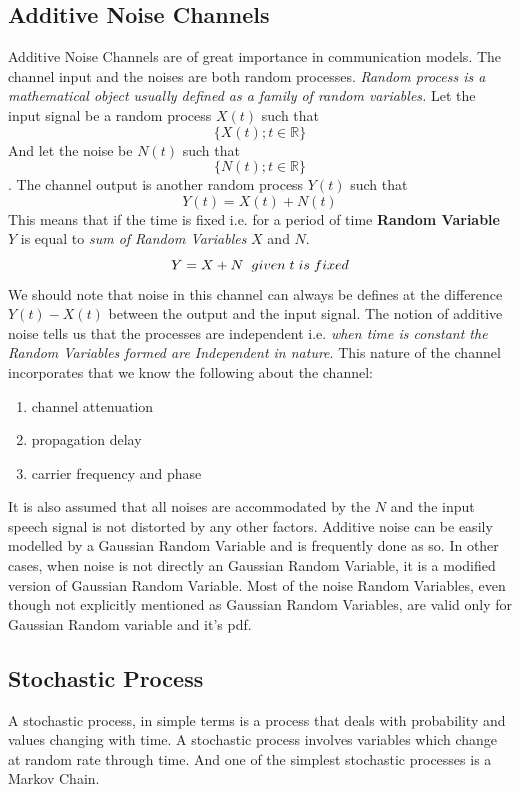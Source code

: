 \documentclass[10pt,twocolumn,letterpaper]{article}
\begin{document}

\subsection{Additive Noise Channels}
Additive Noise Channels are of great importance in communication models. The channel input and the noises are both random processes. \textit{Random process is a mathematical object usually defined as a family of random variables.} Let the input signal be a random process $X(t)$ such that   
$$ \{X(t); t \in \mathbb{R}\}$$
And let the noise be $N(t)$ such that 
$$ \{N(t); t \in \mathbb{R}\}$$.
The channel output is another random process $Y(t)$ such that
$$ Y(t) = X(t) + N(t)$$
This means that if the time is fixed i.e. for a period of time \textbf{Random Variable} $Y$ is equal to \textit{sum of Random Variables} $X$ and $N$.
$$Y = X + N \hspace{0.2cm} given \hspace{0.1cm} t \hspace{0.1cm} is \hspace{0.1cm} fixed$$
We should note that noise in this channel can always be defines at the difference $Y(t) - X(t)$ between the output and the input signal. The notion of additive noise tells us that the processes are independent i.e. \textit{when time is constant the Random Variables formed are Independent in nature}. This nature of the channel incorporates that we know the following about the channel:
\begin{enumerate}
    \item channel attenuation
    \item propagation delay
    \item carrier frequency and phase
\end{enumerate}
It is also assumed that all noises are accommodated by the $N$ and the input speech signal is not distorted by any other factors.
Additive noise can be easily modelled by a Gaussian Random Variable and is frequently done as so. In other cases, when noise is not directly an Gaussian Random Variable, it is a modified version of Gaussian Random Variable. Most of the noise Random Variables, even though not explicitly mentioned as Gaussian Random Variables, are valid only for Gaussian Random variable and it's pdf.


\subsection{Stochastic Process}
A stochastic process, in simple terms is a process that deals with probability and values changing with time. A stochastic process involves variables which change at random rate through time. And one of the simplest stochastic processes is a Markov Chain.
\end{document}
